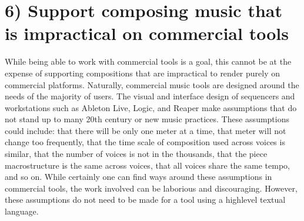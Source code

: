 \documentclass[letterpaper,10pt,english]{sphinxmanual}
\begin{document}
\section{6) Support composing music that is impractical on commercial tools}
\label{\detokenize{goals:support-composing-music-that-is-impractical-on-commercial-tools}}
\sphinxAtStartPar
While being able to work with commercial tools is a goal, this cannot be at the expense of supporting
compositions that are impractical to render purely on commercial platforms.
Naturally, commercial music tools are designed around the needs of the majority of users.
The visual and interface design of sequencers and workstations such as Ableton Live, Logic, and Reaper
make assumptions that do not stand up to many 20th century or new music practices.
These assumptions could include: that there will be only one meter at a time, that meter will not change too frequently,
that the time scale of composition used across voices is similar, that the number of voices is not
in the thousands, that the piece macro\sphinxhyphen{}structure is the same across voices, that all voices share the same tempo,
and so on. While certainly one can find ways around these assumptions in commercial tools, the work
involved can be laborious and discouraging.
However, these assumptions do not need to be made for a tool using a high\sphinxhyphen{}level textual language.
\end{document}
